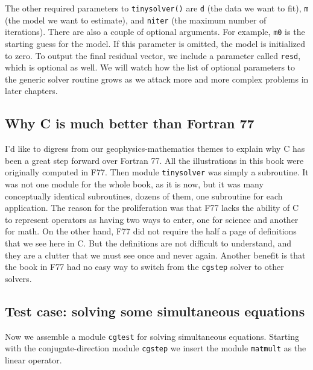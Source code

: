 \par
The other required parameters to \texttt{tinysolver()} 
are \texttt{d} (the data we want to fit),
\texttt{m} (the model we want to estimate),
and \texttt{niter} (the maximum number of iterations).
There are also a couple of optional arguments.
For example, \texttt{m0} is the starting guess for the model.
If this parameter is omitted, the model is initialized to zero.
To output the final residual vector,
we include a parameter called \texttt{resd},
which is optional as well.
We will watch how the list of optional parameters
to the generic solver routine grows
as we attack more and more complex problems in later chapters.

\subsection{Why C is much better than Fortran 77}
I'd like to digress from our geophysics-mathematics themes
to explain why C has been a great step forward
over Fortran 77.
All the illustrations in this book were originally computed in F77.
Then module
\texttt{tinysolver} 
was simply a subroutine.
It was not one module for the whole book, as it is now,
but it was many conceptually identical subroutines,
dozens of them, one subroutine for each application.
The reason for the proliferation was that F77 lacks the ability of C
to represent operators as having two ways to enter,
one for science and another for math.
On the other hand, F77 did not require the half a page
of definitions that we see here in C.
But the definitions are not difficult to understand,
and they are a clutter that we must see once and never again.
Another benefit is that the book in F77 had no easy way to switch
from the \texttt{cgstep} solver to other solvers.


\subsection{Test case: solving some simultaneous equations}
\par
Now we assemble a module \texttt{cgtest} for solving simultaneous equations.
Starting with the conjugate-direction module {\tt cgstep} 
we insert the module \texttt{matmult}  as the linear operator.

